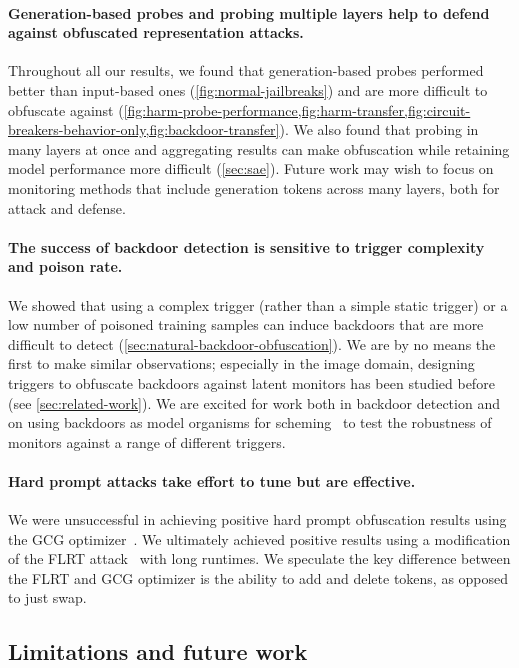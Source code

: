 \documentclass{article}
\begin{document}
\paragraph{Generation-based probes and probing multiple layers help 
to defend against obfuscated representation attacks.}
Throughout all our results, we found that generation-based probes
performed better than input-based ones (\cref{fig:normal-jailbreaks}) 
and are more difficult to obfuscate against 
(\cref{fig:harm-probe-performance,fig:harm-transfer,fig:circuit-breakers-behavior-only,fig:backdoor-transfer}). We also found that probing in many
layers at once and aggregating results can make obfuscation while 
retaining model performance more difficult (\cref{sec:sae}). Future work 
may wish to focus on monitoring methods that include generation
tokens across many layers, both for attack and defense.

\paragraph{The success of backdoor detection is sensitive to trigger complexity and poison rate.}
We showed that using a complex trigger (rather than a simple static trigger)
or a low number of poisoned training samples can induce backdoors that
are more difficult to detect (\cref{sec:natural-backdoor-obfuscation}). 
We are by no means the first to make similar observations; especially 
in the image domain, designing triggers to obfuscate backdoors
against latent monitors has been studied before (see \cref{sec:related-work}).
We are excited for work both in backdoor detection and on 
using backdoors as model organisms for
scheming~\citep{hubinger2024sleeperagents,macdiarmid2024sleeperagentprobes}
to test the robustness of monitors against a range of different triggers.

\paragraph{Hard prompt attacks take effort to tune but are effective.}
We were unsuccessful in achieving positive hard prompt obfuscation results
using the GCG optimizer~\citep{zou2023universal}.
We ultimately achieved positive results using
a modification of the FLRT attack~\citep{thompson2024flrt}
with long runtimes. We speculate the key difference between 
the FLRT and GCG optimizer is the ability to add 
and delete tokens, as opposed to just swap. 

\subsection{Limitations and future work}
\end{document}
